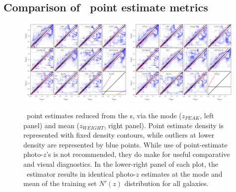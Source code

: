 
\subsection{Comparison of \pz\ point estimate metrics}
\label{sec:pointmetrics_results}

\begin{figure}
\centering
\includegraphics[width=0.49\textwidth]{fig/ZPEAK_szpz_threecolumn_12codes_navy_lowalpha.jpg}
\includegraphics[width=0.49\textwidth]{fig/ZWEIGHT_szpz_threecolumn_12codes_navy_lowalpha.jpg}
\caption{\Pz\ point estimates reduced from the \pzpdf s, via the mode ($z_{PEAK}$, left panel) and mean ($z_{WEIGHT}$, right panel).
Point estimate density is represented with fixed density contours, while outliers at lower density are represented by blue points.
While use of point-estimate photo-$z$'s is not recommended, they do make for useful comparative and visual diagnostics.
In the lower-right panel of each plot, the \trainz\ estimator results in identical photo-$z$ estimates at the mode and mean of the training set $N'(z)$ distribution for all galaxies.}
\label{fig:pz_pointestimates}
\end{figure}

